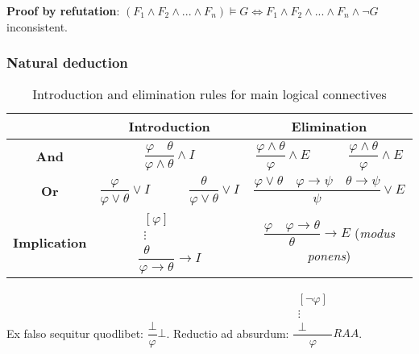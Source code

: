 \documentclass[]{article}
\begin{document}
\noindent \textbf{Proof by refutation}: $(F_1 \land F_2 \land ... \land F_n) \models G \iff F_1 \land F_2 \land ... \land F_n \land \neg G $ inconsistent.

\subsubsection{Natural deduction}

\begin{table}[h]
	\centering
	\caption{Introduction and elimination rules for main logical connectives}
	\begin{tabular}{ |c |c|c | } 
		\hline
		& \textbf{Introduction} & \textbf{Elimination} \\
		\hline
		\textbf{And} & $\dfrac{\varphi \hspace{1em} \theta}{\varphi \land \theta}\land I$ & $\dfrac{\varphi \land \theta}{\varphi}\land E \hspace{3em} \dfrac{\varphi \land \theta}{\varphi}\land E$ \\
		\hline
		\textbf{Or} & $\dfrac{\varphi}{\varphi \lor \theta} \lor I \hspace{3em} \dfrac{\theta}{\varphi \lor \theta} \lor I$ & $\dfrac{\varphi \lor \theta \hspace{1em} \varphi \rightarrow \psi \hspace{1em} \theta \rightarrow \psi}{\psi} \lor E$ \\
		\hline
		\textbf{Implication} & $\dfrac{\begin{array}{c} [\varphi] \\ \vdots \\ \theta \end{array}}{\varphi \rightarrow \theta} \rightarrow I$ & $\dfrac{\varphi \hspace{1em} \varphi \rightarrow \theta}{\theta} \rightarrow E$ (\textit{modus ponens}) \\
		\hline
	\end{tabular}
\end{table}

\noindent Ex falso sequitur quodlibet: $\dfrac{\bot}{\varphi}\bot$. Reductio ad absurdum: $\dfrac{\begin{array}{c} [\neg \varphi] \\ \vdots \\ \bot \end{array}}{\varphi} RAA$.

\end{document}
